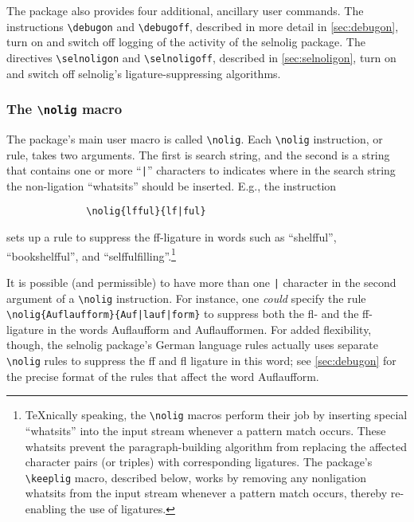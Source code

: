 \documentclass[11pt]{article}
\newcommand{\pkg}[1]{\textsf{#1}}
\newcommand{\cmmd}[1]{\texttt{\textbackslash #1}}
\begin{document}
The package also provides four additional, ancillary user commands. The instructions \cmmd{debugon} and \cmmd{debugoff}, described in more detail in \cref{sec:debugon}, turn on and switch off logging of the activity of the \pkg{selnolig} package. The directives \cmmd{selnoligon} and \cmmd{selnoligoff}, described in \cref{sec:selnoligon}, turn on and switch off \pkg{selnolig}'s ligature-suppressing algorithms.



\subsubsection{The \cmmd{nolig} macro}
\label{sec:nolig}

The package's main user macro is called \cmmd{nolig}. Each \cmmd{nolig} instruction, or rule, takes two arguments. The first is search string, and the second is a string that contains one or more ``\Verb+|+'' characters to indicates where in the search string the non-ligation \enquote{whatsits} should be inserted. E.g., the instruction
\begin{Verbatim}
              \nolig{lfful}{lf|ful}
\end{Verbatim}
sets up a rule to suppress the ff-ligature in words such as \enquote{shelfful}, \enquote{bookshelfful}, and \enquote{selffulfilling}.\footnote{\TeX nically speaking, the \cmmd{nolig} macros perform their job by inserting special \enquote{whatsits} into the input stream whenever a pattern match occurs. These whatsits prevent the paragraph-building algorithm from replacing the affected character pairs (or triples) with corresponding ligatures. The package's \cmmd{keeplig} macro, described below, works by removing any nonligation whatsits from the input stream whenever a pattern match occurs, thereby re-enabling the use of ligatures.}

It is possible (and permissible) to have more than one \Verb+|+ character in the second argument of a \cmmd{nolig} instruction. For instance, one \emph{could} specify the rule \Verb+\nolig{Auflaufform}{Auf|lauf|form}+ to suppress both the fl- and the ff-ligature in the words Auflaufform and Auflaufformen. For added flexibility, though, the \pkg{selnolig} package's German language rules actually uses separate \cmmd{nolig} rules to suppress the ff and fl ligature in this word; see  \cref{sec:debugon} for the precise format of the rules that affect the word Auflaufform.
\end{document}

